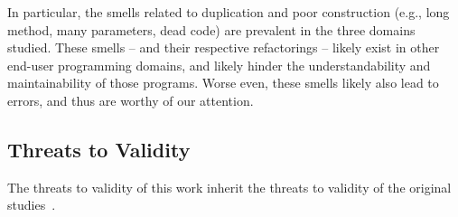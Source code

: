 \documentclass[10pt,conference,compsocconf]{IEEEtran}
\newcommand{\todo}[1]{\textbf{TODO: #1}}
\begin{document}
In particular, the smells related to duplication and poor construction (e.g., long method, many parameters, dead code) are  prevalent in the three domains studied. These smells -- and their respective refactorings -- likely exist in other end-user programming domains, and likely hinder the understandability and maintainability of those programs. Worse even, these smells likely also lead to errors, and thus are worthy of our attention. 




\subsection{Threats to Validity}
The threats to validity of this work inherit the threats to validity of the original studies~\cite{Stolee2015, Stolee2011, StoleeTSE2013, Hermans2011, Hermans2012intra, Hermans2012inter, hermans2014bumblebee, chambers2013smell, chambers2015impact, badame2012refactoring}.
\end{document}
